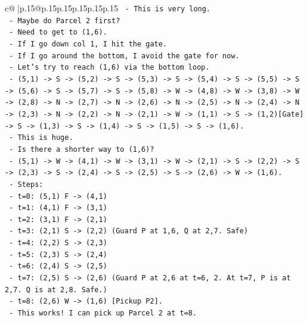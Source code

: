 \documentclass{article}
\begin{document}
{\begin{supertabular}{c@{$\;$}|p{.15\linewidth}@{}p{.15\linewidth}p{.15\linewidth}p{.15\linewidth}p{.15\linewidth}p{.15\linewidth}}
{{{\texttt{            {-} This is very long.} \\
\texttt{          {-} Maybe do Parcel 2 first?} \\
\texttt{            {-} Need to get to (1,6).} \\
\texttt{            {-} If I go down col 1, I hit the gate.} \\
\texttt{            {-} If I go around the bottom, I avoid the gate for now.} \\
\texttt{            {-} Let's try to reach (1,6) via the bottom loop.} \\
\texttt{            {-} (5,1) {-}> S {-}> (5,2) {-}> S {-}> (5,3) {-}> S {-}> (5,4) {-}> S {-}> (5,5) {-}> S {-}> (5,6) {-}> S {-}> (5,7) {-}> S {-}> (5,8) {-}> W {-}> (4,8) {-}> W {-}> (3,8) {-}> W {-}> (2,8) {-}> N {-}> (2,7) {-}> N {-}> (2,6) {-}> N {-}> (2,5) {-}> N {-}> (2,4) {-}> N {-}> (2,3) {-}> N {-}> (2,2) {-}> N {-}> (2,1) {-}> W {-}> (1,1) {-}> S {-}> (1,2){[}Gate{]} {-}> S {-}> (1,3) {-}> S {-}> (1,4) {-}> S {-}> (1,5) {-}> S {-}> (1,6).} \\
\texttt{            {-} This is huge.} \\
\texttt{            {-} Is there a shorter way to (1,6)?} \\
\texttt{            {-} (5,1) {-}> W {-}> (4,1) {-}> W {-}> (3,1) {-}> W {-}> (2,1) {-}> S {-}> (2,2) {-}> S {-}> (2,3) {-}> S {-}> (2,4) {-}> S {-}> (2,5) {-}> S {-}> (2,6) {-}> W {-}> (1,6).} \\
\texttt{            {-} Steps:} \\
\texttt{              {-} t=0: (5,1) F {-}> (4,1)} \\
\texttt{              {-} t=1: (4,1) F {-}> (3,1)} \\
\texttt{              {-} t=2: (3,1) F {-}> (2,1)} \\
\texttt{              {-} t=3: (2,1) S {-}> (2,2) (Guard P at 1,6, Q at 2,7. Safe)} \\
\texttt{              {-} t=4: (2,2) S {-}> (2,3)} \\
\texttt{              {-} t=5: (2,3) S {-}> (2,4)} \\
\texttt{              {-} t=6: (2,4) S {-}> (2,5)} \\
\texttt{              {-} t=7: (2,5) S {-}> (2,6) (Guard P at 2,6 at t=6, 2. At t=7, P is at 2,7. Q is at 2,8. Safe.)} \\
\texttt{              {-} t=8: (2,6) W {-}> (1,6) {[}Pickup P2{]}.} \\
\texttt{            {-} This works! I can pick up Parcel 2 at t=8.} \\
}}}
\end{supertabular}}
\end{document}
